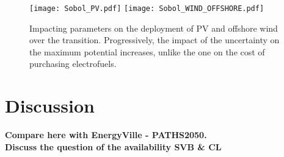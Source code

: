 \begin{figure}[htbp!]
\centering
\texttt{[image: Sobol\_PV.pdf]}
\texttt{[image: Sobol\_WIND\_OFFSHORE.pdf]}
\caption{Impacting parameters on the deployment of \gls{PV} and offshore wind over the transition. Progressively, the impact of the uncertainty on the maximum potential increases, unlike the one on the cost of purchasing electrofuels.}
\label{fig:results_uq_pdf_local_ren}
\end{figure}


\section{Discussion}
\label{sec:atom_mol:discuss}

{\color{red} \textbf{Compare here with EnergyVille - PATHS2050.}}\\

{\color{red} \textbf{Discuss the question of the availability SVB \& CL}}\\